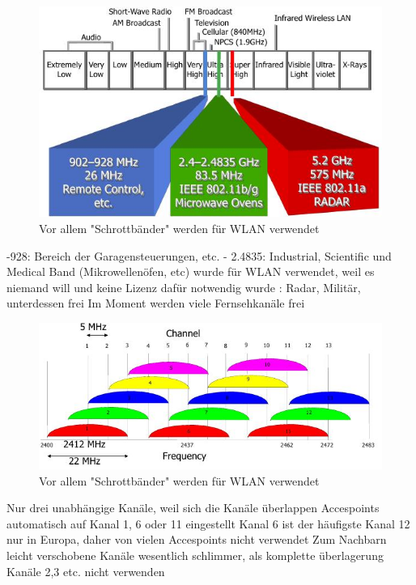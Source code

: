\documentclass[ngerman,a4paper,12pt]{scrreprt}
\begin{document}
\begin{figure}[H]
	\centering
	 \includegraphics[width=\textwidth]{img/V6.8.jpg}
	 \caption{Vor allem "Schrottbänder" werden für WLAN verwendet}
	\label{}
\end{figure}

\ul
	-928: Bereich der Garagensteuerungen, etc.
	 - 2.4835: Industrial, Scientific und Medical Band (Mikrowellenöfen, etc) wurde für WLAN verwendet, weil es niemand will und keine Lizenz dafür notwendig wurde
	: Radar, Militär, unterdessen frei
	\li Im Moment werden viele Fernsehkanäle frei
\ulE

\begin{figure}[H]
	\centering
	 \includegraphics[width=\textwidth]{img/V6.9.jpg}
	 \caption{Vor allem "Schrottbänder" werden für WLAN verwendet}
	\label{}
\end{figure}
\ul
	\li Nur drei unabhängige Kanäle, weil sich die Kanäle überlappen
	\li Accespoints automatisch auf Kanal 1, 6 oder 11 eingestellt
	\li Kanal 6 ist der häufigste
	\li Kanal 12 nur in Europa, daher von vielen Accespoints nicht verwendet
	\li Zum Nachbarn leicht verschobene Kanäle wesentlich schlimmer, als komplette überlagerung \ra Kanäle 2,3 etc. nicht verwenden
	\li 
\ulE
\end{document}
